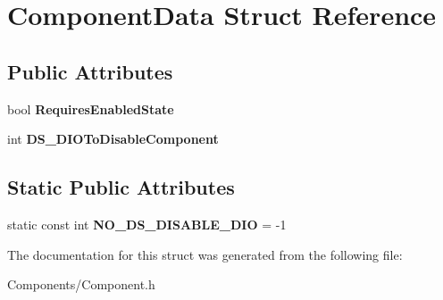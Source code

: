 \hypertarget{struct_component_data}{
\section{\-Component\-Data \-Struct \-Reference}
\label{struct_component_data}
}
\subsection*{\-Public \-Attributes}
\begin{DoxyCompactItemize}
\item 
\hypertarget{struct_component_data_afafa4f0c57b348b26e8bfaaa3dbe43c3}{
bool {\bfseries \-Requires\-Enabled\-State}}
\label{struct_component_data_afafa4f0c57b348b26e8bfaaa3dbe43c3}

\item 
\hypertarget{struct_component_data_a53b08d9549a0e2b0453247f5672455af}{
int {\bfseries \-D\-S\-\_\-\-D\-I\-O\-To\-Disable\-Component}}
\label{struct_component_data_a53b08d9549a0e2b0453247f5672455af}

\end{DoxyCompactItemize}
\subsection*{\-Static \-Public \-Attributes}
\begin{DoxyCompactItemize}
\item 
\hypertarget{struct_component_data_adfdd5e2b8b8c5893594bdb28fc2adbe8}{
static const int {\bfseries \-N\-O\-\_\-\-D\-S\-\_\-\-D\-I\-S\-A\-B\-L\-E\-\_\-\-D\-I\-O} = -\/1}
\label{struct_component_data_adfdd5e2b8b8c5893594bdb28fc2adbe8}

\end{DoxyCompactItemize}


\-The documentation for this struct was generated from the following file\-:\begin{DoxyCompactItemize}
\item 
\-Components/\-Component.\-h\end{DoxyCompactItemize}
